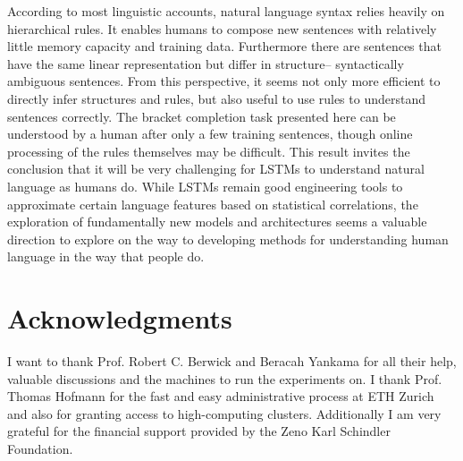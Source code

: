 \documentclass[11pt,a4paper]{article}
\begin{document}
According to most linguistic accounts, natural language syntax relies heavily on hierarchical rules. It enables humans to compose new sentences with relatively little memory capacity and training data. Furthermore there are sentences that have the same linear representation but differ in structure-- syntactically ambiguous sentences.  From this perspective, it seems not only more efficient to directly infer structures and rules, but also useful to use rules to understand sentences correctly. The bracket completion task presented here can be understood by a human after only a few training sentences, though online processing of the rules themselves may be difficult. This result invites the conclusion that it will be very challenging for LSTMs to understand natural language as humans do. While LSTMs remain good engineering tools to approximate certain language features based on statistical correlations, the exploration of fundamentally new models and architectures seems a valuable direction to explore on the way to developing methods for understanding human language in the way that people do.

\section*{Acknowledgments}
I want to thank Prof. Robert C. Berwick and Beracah Yankama for all their help, valuable discussions and the machines to run the experiments on. I thank Prof. Thomas Hofmann for the fast and easy administrative process at ETH Zurich and also for granting access to high-computing clusters. Additionally I am very grateful for the financial support provided by the Zeno Karl Schindler Foundation.



\end{document}
